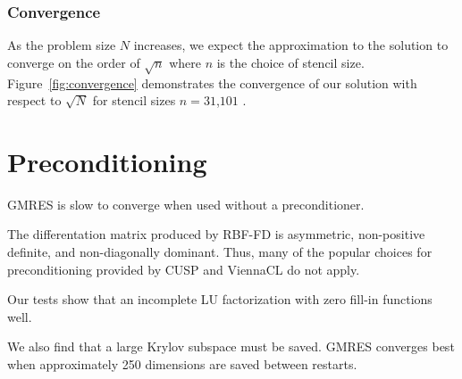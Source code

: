 \subsubsection{Convergence}


As the problem size $N$ increases, we expect the approximation to the solution to converge on the order of $\sqrt{n}$ where $n$ is the choice of stencil size. Figure~\ref{fig:convergence} demonstrates the convergence of our solution with respect to $\sqrt{N}$ for stencil sizes $n=31$,$101$ . 




\section{Preconditioning} 

GMRES is slow to converge when used without a preconditioner. 

The differentation matrix produced by RBF-FD is asymmetric, non-positive definite, and non-diagonally dominant. Thus, many of the popular choices for preconditioning provided by CUSP and ViennaCL do not apply. 

Our tests show that an incomplete LU factorization with zero fill-in \cite{Saad2003} functions well. 

We also find that a large Krylov subspace must be saved. GMRES converges best when approximately 250 dimensions are saved between restarts. 







